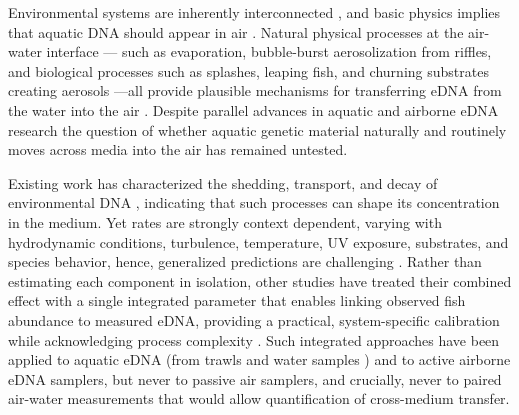 \documentclass{article}
\begin{document}
Environmental systems are inherently interconnected \cite{folke2021}, and basic physics implies that aquatic DNA should appear in air \cite{monahan1986, seinfeld2016}. Natural physical processes at the air-water interface — such as evaporation, bubble-burst aerosolization from riffles, and biological processes such as splashes, leaping fish, and churning substrates creating aerosols —all provide plausible mechanisms for transferring eDNA from the water into the air \cite{duchemin2002, mueller2008, stell2020, vandijk2003}. Despite parallel advances in aquatic and airborne eDNA research \cite{altermatt2025, klepke2022, johnson2024, lynggaard2023} the question of whether aquatic genetic material naturally and routinely moves across media into the air has remained untested. 

Existing work has characterized the shedding, transport, and decay of environmental DNA \cite{strickler2015, harrison2019, kirchgeorg2024, shogren2017}, indicating that such processes can shape its concentration in the medium. Yet rates are strongly context dependent, varying with hydrodynamic conditions, turbulence, temperature, UV exposure, substrates, and species behavior, hence, generalized predictions are challenging \cite{brandao-dias2023, harrison2019, shogren2017}. Rather than estimating each component in isolation, other studies have  treated their combined effect with a single integrated parameter that enables linking observed fish abundance to measured eDNA, providing a practical, system-specific calibration while acknowledging process complexity \cite{guri2024a}. Such integrated approaches have been applied to aquatic eDNA (from trawls and water samples \cite{guri2024a, shelton2022}) and to active airborne eDNA samplers, but never to passive air samplers, and crucially, never to paired air-water measurements that would allow quantification of cross-medium transfer.
\end{document}
